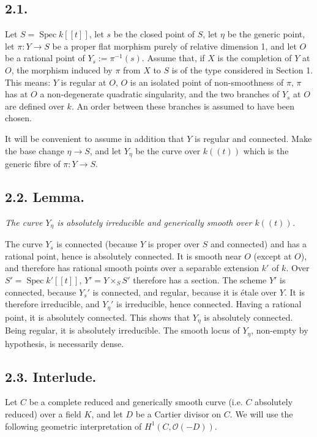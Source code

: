 \documentclass[11pt,leqno]{article}
\DeclareMathOperator{\Spec}{Spec}
\newcommand{\OO}{\mathcal O}
\begin{document}
\subsection*{2.1.}
Let $S=\Spec k[[t]]$, let $s$ be the closed point of $S$, let $\eta$ be the generic point, let $\pi:Y\to S$ be a proper flat morphism purely of relative dimension 1, and let $O$ be a rational point of $Y_s:=\pi^{-1}(s)$. Assume that, if $X$ is the completion of $Y$ at $O$, the morphism induced by $\pi$ from $X$ to $S$ is of the type considered in Section 1. This means: $Y$ is regular at $O$, $O$ is an isolated point of non-smoothness of $\pi$, $\pi$ has at $O$ a non-degenerate quadratic singularity, and the two branches of $Y_s$ at $O$ are defined over $k$. An order between these branches is assumed to have been chosen.

It will be convenient to assume in addition that $Y$ is regular and connected. Make the base change $\eta\to S$, and let $Y_\eta$ be the curve over $k((t))$ which is the generic fibre of $\pi:Y\to S$.

\subsection*{2.2. Lemma.}
\emph{The curve $Y_\eta$ is absolutely irreducible and generically smooth over $k((t))$.}

The curve $Y_s$ is connected (because $Y$ is proper over $S$ and connected) and has a rational point, hence is absolutely connected. It is smooth near $O$ (except at $O$),
\clearpage
and therefore has rational smooth points over a separable extension $k'$ of $k$. Over $S'=\Spec k'[[t]]$, $Y'=Y\times_SS'$ therefore has a section. The scheme $Y'$ is connected, because $Y_s'$ is connected, and regular, because it is étale over $Y$. It is therefore irreducible, and $Y_\eta'$ is irreducible, hence connected. Having a rational point, it is absolutely connected. This shows that $Y_\eta$ is absolutely connected. Being regular, it is absolutely irreducible. The smooth locus of $Y_\eta$, non-empty by hypothesis, is necessarily dense.

\subsection*{2.3. Interlude.}
Let $C$ be a complete reduced and generically smooth curve (i.e. $C$ absolutely reduced) over a field $K$, and let $D$ be a Cartier divisor on $C$. We will use the following geometric interpretation of $H^1(C,\OO(-D))$.
\end{document}
